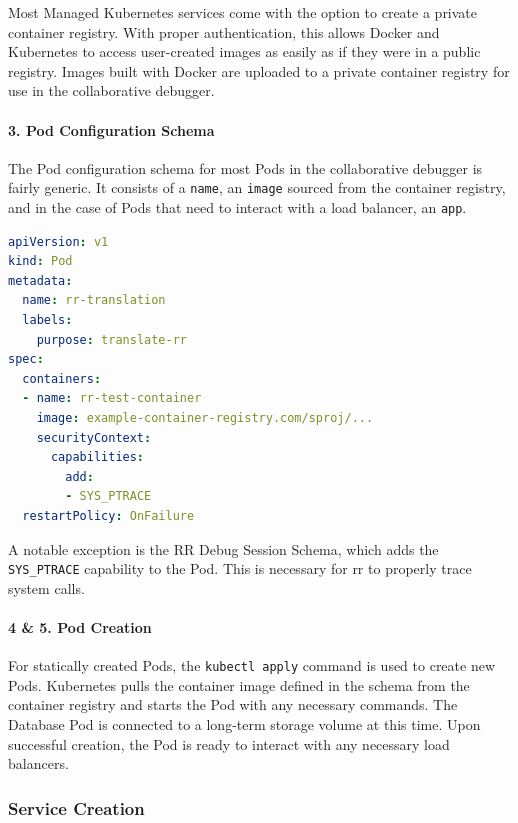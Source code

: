 \documentclass[12pt]{article}
\begin{document}
Most Managed Kubernetes services come with the option to create a
private container registry.  With proper authentication, this allows
Docker and Kubernetes to access user-created images as easily as if
they were in a public registry.  Images built with Docker are uploaded
to a private container registry for use in the collaborative debugger.

\paragraph{3. Pod Configuration Schema} \label{podschema}

The Pod configuration schema for most Pods in the collaborative
debugger is fairly generic.  It consists of a \lstinline{name}, an
\lstinline{image} sourced from the container registry, and in the case
of Pods that need to interact with a load balancer, an
\lstinline{app}.

\begin{lstlisting}[language=YAML,basicstyle=\linespread{0.5}\ttfamily,caption={RR Debug Session Schema},captionpos=b]
apiVersion: v1
kind: Pod
metadata:
  name: rr-translation
  labels:
    purpose: translate-rr
spec:
  containers:
  - name: rr-test-container
    image: example-container-registry.com/sproj/...
    securityContext:
      capabilities:
        add:
        - SYS_PTRACE
  restartPolicy: OnFailure
\end{lstlisting}

A notable exception is the RR Debug Session Schema, which adds the
\lstinline{SYS_PTRACE} capability to the Pod.  This is necessary for
rr to properly trace system calls.

\paragraph{4 \& 5. Pod Creation}

For statically created Pods, the \lstinline{kubectl apply} command is
used to create new Pods.  Kubernetes pulls the container image defined
in the schema from the container registry and starts the Pod with any
necessary commands.  The Database Pod is connected to a long-term
storage volume at this time.  Upon successful creation, the Pod is
ready to interact with any necessary load balancers.

\subsubsection{Service Creation}
\end{document}
